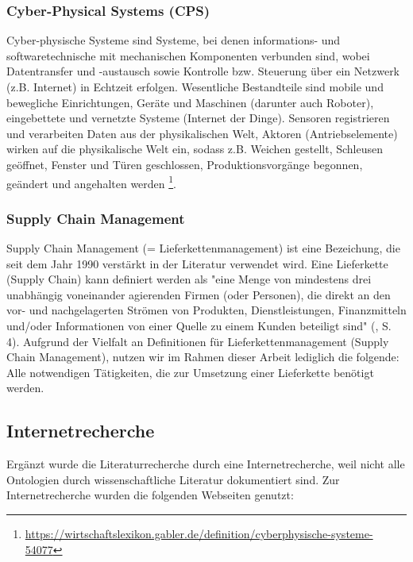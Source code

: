 \documentclass{article}
\begin{document}
\subsubsection{Cyber-Physical Systems (CPS)}

Cyber-physische Systeme sind Systeme, bei denen informations- und softwaretechnische mit mechanischen Komponenten verbunden sind, wobei Datentransfer und -austausch sowie Kontrolle bzw. Steuerung über ein Netzwerk (z.B. Internet) in Echtzeit erfolgen.
Wesentliche Bestandteile sind mobile und bewegliche Einrichtungen, Geräte und Maschinen (darunter auch Roboter), eingebettete und vernetzte Systeme (Internet der Dinge).
Sensoren registrieren und verarbeiten Daten aus der physikalischen Welt, Aktoren (Antriebselemente) wirken auf die physikalische Welt ein, sodass z.B. Weichen gestellt, Schleusen geöffnet, Fenster und Türen geschlossen, Produktionsvorgänge begonnen, geändert und angehalten werden \footnote{\url{https://wirtschaftslexikon.gabler.de/definition/cyberphysische-systeme-54077}}.

\subsubsection{Supply Chain Management}

Supply Chain Management (= Lieferkettenmanagement) ist eine Bezeichung, die seit dem Jahr 1990 verstärkt in der Literatur verwendet wird. Eine Lieferkette (Supply Chain) kann definiert werden als "eine Menge von mindestens drei unabhängig voneinander agierenden Firmen (oder Personen), die direkt an den vor- und nachgelagerten Strömen von Produkten, Dienstleistungen, Finanzmitteln und/oder Informationen von einer Quelle zu einem Kunden beteiligt sind" (\cite{mentzer2001defining}, S. 4). Aufgrund der Vielfalt an Definitionen für Lieferkettenmanagement (Supply Chain Management), nutzen wir im Rahmen dieser Arbeit lediglich die folgende: Alle notwendigen Tätigkeiten, die zur Umsetzung einer Lieferkette benötigt werden.

\subsection{Internetrecherche}

Ergänzt wurde die Literaturrecherche durch eine Internetrecherche, weil nicht alle Ontologien durch wissenschaftliche Literatur dokumentiert sind.
Zur Internetrecherche wurden die folgenden Webseiten genutzt:
\end{document}
